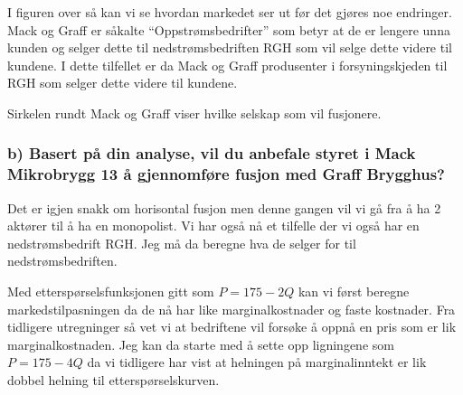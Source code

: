\documentclass[
  12pt,
  a4paper,
  DIV=11,
  numbers=noendperiod]{scrartcl}
\begin{document}

I figuren over så kan vi se hvordan markedet ser ut før det gjøres noe
endringer. Mack og Graff er såkalte ``Oppstrømsbedrifter'' som betyr at
de er lengere unna kunden og selger dette til nedstrømsbedriften RGH som
vil selge dette videre til kundene. I dette tilfellet er da Mack og
Graff produsenter i forsyningskjeden til RGH som selger dette videre til
kundene.

Sirkelen rundt Mack og Graff viser hvilke selskap som vil fusjonere.

\clearpage

\subsubsection{b) Basert på din analyse, vil du anbefale styret i Mack
Mikrobrygg 13 å gjennomføre fusjon med Graff
Brygghus?}\label{b-basert-puxe5-din-analyse-vil-du-anbefale-styret-i-mack-mikrobrygg-13-uxe5-gjennomfuxf8re-fusjon-med-graff-brygghus}

Det er igjen snakk om horisontal fusjon men denne gangen vil vi gå fra å
ha 2 aktører til å ha en monopolist. Vi har også nå et tilfelle der vi
også har en nedstrømsbedrift RGH. Jeg må da beregne hva de selger for
til nedstrømsbedriften.

Med etterspørselsfunksjonen gitt som \(P=175-2Q\) kan vi først beregne
markedstilpasningen da de nå har like marginalkostnader og faste
kostnader. Fra tidligere utregninger så vet vi at bedriftene vil forsøke
å oppnå en pris som er lik marginalkostnaden. Jeg kan da starte med å
sette opp ligningene som \(P=175-4Q\) da vi tidligere har vist at
helningen på marginalinntekt er lik dobbel helning til
etterspørselskurven.
\end{document}
